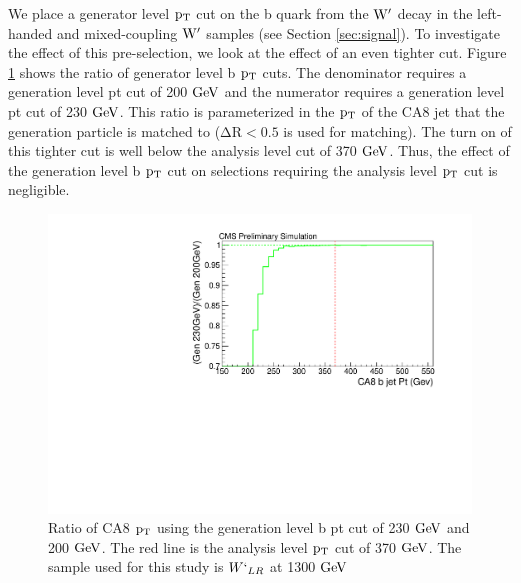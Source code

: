 We place a generator level $\mathrm{p_{T}}$ cut on the b quark from the $\mathrm{W}^\prime$ decay in the left-handed and mixed-coupling $\mathrm{W}^\prime$ samples (see Section \ref{sec:signal}).  
To investigate the effect of this pre-selection, we look at the effect of an even tighter cut.  
Figure \ref{figs:genptcut} shows the ratio of generator level b $\mathrm{p_{T}}$ cuts.  
The denominator requires a generation level pt cut of 200 $\mathrm{GeV}$ and the numerator requires a generation level pt cut of 230 $\mathrm{GeV}$.  
This ratio is parameterized in the $\mathrm{p_{T}}$ of the CA8 jet that the generation particle is matched to ($\mathrm{\Delta R  < 0.5}$ is used for matching).
The turn on of this tighter cut is well below the analysis level cut of 370$~\mathrm{GeV}$.  Thus, the effect of the generation level b $\mathrm{p_{T}}$ cut 
on selections requiring the analysis level $\mathrm{p_{T}}$ cut is negligible.  

\begin{figure}[Htcb]
\centering
\includegraphics[width=1.0\textwidth]{AN-13-004/figs/bjetptcut.pdf}
\caption{Ratio of CA8 $\mathrm{p_{T}}$ using the generation level b pt cut of 230$~\mathrm{GeV}$ and 200$~\mathrm{GeV}$.  The red line is the analysis level $\mathrm{p_{T}}$ cut of 370$~\mathrm{GeV}$.  The sample used for this study is $W`_{LR}$ at 1300$~\mathrm{GeV}$}
\label{figs:genptcut}
\end{figure}



